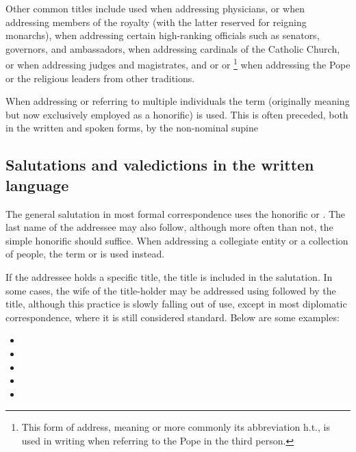 Other common titles include  used when addressing physicians,
 or  when addressing members of the royalty (with
the latter reserved for reigning monarchs),  when addressing
certain high-ranking officials such as senators, governors, and ambassadors,
 when addressing cardinals of the Catholic Church,  or
 when addressing judges and magistrates, and  or
 or \footnote{This form of address, meaning
 or more commonly its abbreviation {\sc h.t.}, is used in
writing when referring to the Pope in the third person.} when addressing the
Pope or the religious leaders from other traditions.

When addressing or referring to multiple individuals the term 
(originally meaning  but now exclusively employed as a honorific) is
used. This is often preceded, both in the written and spoken forms, by the
non-nominal supine 

\subsection{Salutations and valedictions in the written language}

The general salutation in most formal correspondence uses the honorific
 or . The last name of the addressee may also
follow, although more often than not, the simple honorific
should suffice. When addressing a collegiate entity or a collection of people,
the term  or  is used instead.

If the addressee holds a specific title, the title is included in the
salutation. In some cases, the wife of the title-holder may be addressed using
 followed by the title, although this practice is slowly falling out of
use, except in most diplomatic correspondence, where it is still considered
standard. Below are some examples:


\begin{itemize}[nosep]
	\item {}
	\item {}
	\item {}
	\item {}
	\item {}
\end{itemize}

